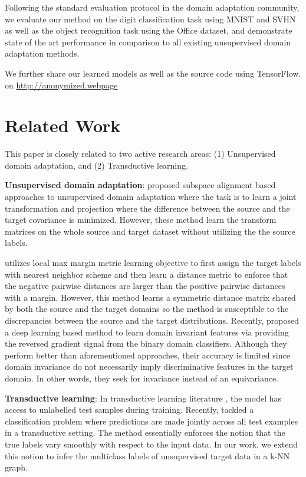 \documentclass{article}
\begin{document}
Following the standard evaluation protocol in the domain adaptation community, we evaluate our method on the digit classification task using MNIST \cite{mnist} and SVHN\cite{svhn} as well as the object recognition task using the Office \cite{office} dataset, and demonstrate state of the art performance in comparison to all existing unsupervised domain adaptation methods. 

We further share our learned models as well as the source code using TensorFlow\cite{tensorflow}. on \url{http://anonymized.webpage}

\section{Related Work} 

This paper is closely related to two active research areas: (1) Unsupervised domain adaptation, and (2) Transductive learning.

\textbf{Unsupervised domain adaptation}: \cite{gong12, baochen15, fernando13, baochen16} proposed subspace alignment based approaches to unsupervised domain adaptation where the task is to learn a joint transformation and projection where the difference between the source and the target covariance is minimized. However, these method learn the transform matrices on the whole source and target dataset without utilizing the the source labels. 

\cite{tommasi13} utilizes local max margin metric learning objective \cite{lmnn} to first assign the target labels with nearest neighbor scheme and then learn a distance metric to enforce that the negative pairwise distances are larger than the positive pairwise distances with a margin. However, this method learns a symmetric distance matrix shared by both the source and the target domains so the method is susceptible to the discrepancies between the source and the target distributions. Recently, \cite{ganin15, tzeng14} proposed a deep learning based method to learn domain invariant features via providing the reversed gradient signal from the binary domain classifiers. Although they perform better than aforementioned approaches, their accuracy is limited since domain invariance do not necessarily imply discriminative features in the target domain. In other words, they seek for invariance instead of an equivariance. 

\textbf{Transductive learning}: In transductive learning literature \cite{transduction}, the model has access to unlabelled test samples during training. Recently, \cite{coclassification} tackled a classification problem where predictions are made jointly across all test examples in a transductive \cite{transduction} setting. The method essentially enforces the notion that the true labels vary smoothly with respect to the input data. In our work, we extend this notion to infer the multiclass labels of unsupervised target data in a k-NN graph. 
\end{document}
